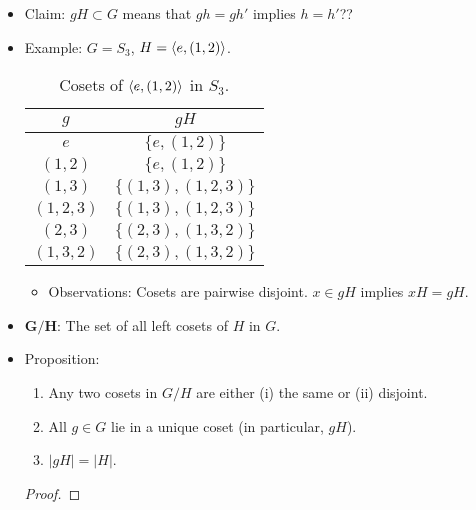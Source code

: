 \documentclass[../notes.tex]{subfiles}
\begin{document}
\begin{itemize}
\begin{itemize}
    \end{itemize}
    \item Claim: $gH\subset G$ means that $gh=gh'$ implies $h=h'$??
    \item Example: $G=S_3$, $H=\left\langle{e,(1,2)}\right\rangle$.
    \begin{table}[h!]
        \centering
        \small
        \renewcommand{\arraystretch}{1.2}
        \begin{tabular}{c|c}
            $g$ & $gH$\\
            \hline
            $e$ & $\{e,(1,2)\}$\\
            $(1,2)$ & $\{e,(1,2)\}$\\
            $(1,3)$ & $\{(1,3),(1,2,3)\}$\\
            $(1,2,3)$ & $\{(1,3),(1,2,3)\}$\\
            $(2,3)$ & $\{(2,3),(1,3,2)\}$\\
            $(1,3,2)$ & $\{(2,3),(1,3,2)\}$\\
        \end{tabular}
        \caption{Cosets of $\left\langle{e,(1,2)}\right\rangle$ in $S_3$.}
        \label{tab:S3Cosets}
    \end{table}
    \begin{itemize}
        \item Observations: Cosets are pairwise disjoint. $x\in gH$ implies $xH=gH$.
    \end{itemize}
    \item $\bm{G/H}$: The set of all left cosets of $H$ in $G$.
    \item Proposition:
    \begin{enumerate}
        \item Any two cosets in $G/H$ are either (i) the same or (ii) disjoint.
        \item All $g\in G$ lie in a unique coset (in particular, $gH$).
        \item $|gH|=|H|$.
    \end{enumerate}
    \begin{proof}



\end{proof}
\end{itemize}
\end{document}
